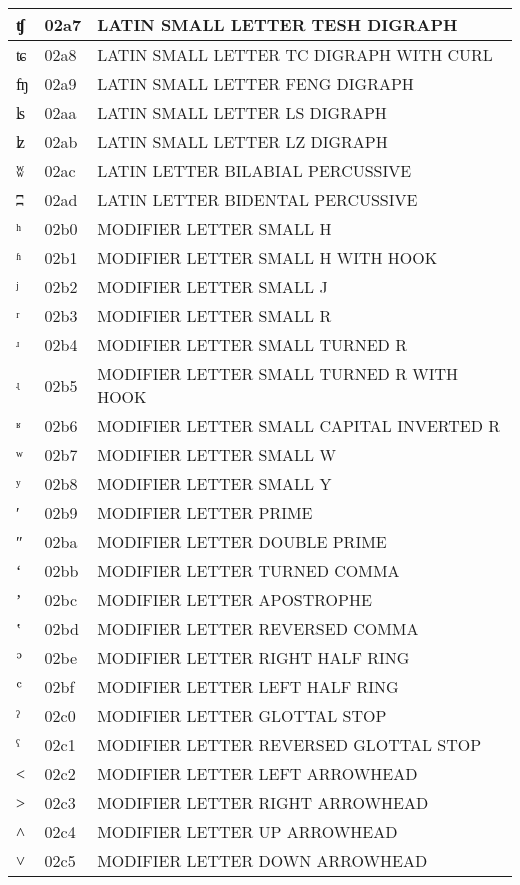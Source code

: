 \documentclass[12pt,letterpaper,openany]{book}
\begin{document}
\begin{center}
\begin{supertabular}{|m{0.25in}|m{0.5in}|m{4in}|}
			ʧ & 02a7 & LATIN SMALL LETTER TESH DIGRAPH\\\hline
			ʨ & 02a8 & LATIN SMALL LETTER TC DIGRAPH WITH CURL\\\hline
			ʩ & 02a9 & LATIN SMALL LETTER FENG DIGRAPH\\\hline
			ʪ & 02aa & LATIN SMALL LETTER LS DIGRAPH\\\hline
			ʫ & 02ab & LATIN SMALL LETTER LZ DIGRAPH\\\hline
			ʬ & 02ac & LATIN LETTER BILABIAL PERCUSSIVE\\\hline
			ʭ & 02ad & LATIN LETTER BIDENTAL PERCUSSIVE\\\hline
			ʰ & 02b0 & MODIFIER LETTER SMALL H\\\hline
			ʱ & 02b1 & MODIFIER LETTER SMALL H WITH HOOK\\\hline
			ʲ & 02b2 & MODIFIER LETTER SMALL J\\\hline
			ʳ & 02b3 & MODIFIER LETTER SMALL R\\\hline
			ʴ & 02b4 & MODIFIER LETTER SMALL TURNED R\\\hline
			ʵ & 02b5 & MODIFIER LETTER SMALL TURNED R WITH HOOK\\\hline
			ʶ & 02b6 & MODIFIER LETTER SMALL CAPITAL INVERTED R\\\hline
			ʷ & 02b7 & MODIFIER LETTER SMALL W\\\hline
			ʸ & 02b8 & MODIFIER LETTER SMALL Y\\\hline
			ʹ & 02b9 & MODIFIER LETTER PRIME\\\hline
			ʺ & 02ba & MODIFIER LETTER DOUBLE PRIME\\\hline
			ʻ & 02bb & MODIFIER LETTER TURNED COMMA\\\hline
			ʼ & 02bc & MODIFIER LETTER APOSTROPHE\\\hline
			ʽ & 02bd & MODIFIER LETTER REVERSED COMMA\\\hline
			ʾ & 02be & MODIFIER LETTER RIGHT HALF RING\\\hline
			ʿ & 02bf & MODIFIER LETTER LEFT HALF RING\\\hline
			ˀ & 02c0 & MODIFIER LETTER GLOTTAL STOP\\\hline
			ˁ & 02c1 & MODIFIER LETTER REVERSED GLOTTAL STOP\\\hline
			˂ & 02c2 & MODIFIER LETTER LEFT ARROWHEAD\\\hline
			˃ & 02c3 & MODIFIER LETTER RIGHT ARROWHEAD\\\hline
			˄ & 02c4 & MODIFIER LETTER UP ARROWHEAD\\\hline
			˅ & 02c5 & MODIFIER LETTER DOWN ARROWHEAD\\\hline

\end{supertabular}
\end{center}
\end{document}
